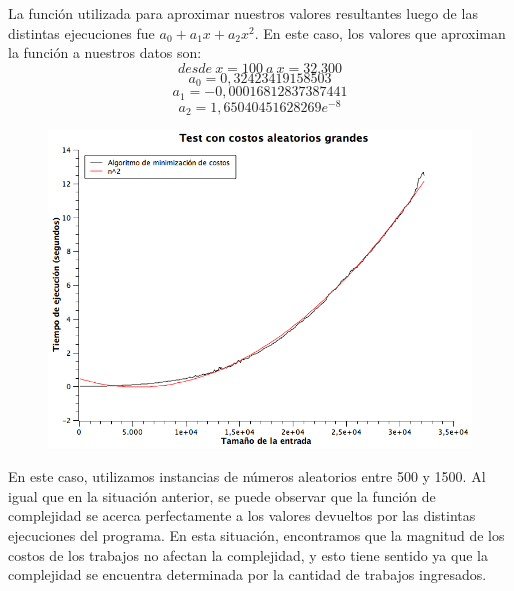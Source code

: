 La función utilizada para aproximar nuestros valores resultantes luego de las distintas ejecuciones fue $a_{0} + a_{1}x + a_{2}x^{2}$.
En este caso, los valores que aproximan la función a nuestros datos son:
$$desde\ x = 100\ a\ x = 32.300$$
$$a_{0} = 0,32423419158503$$
$$a_{1} = -0,00016812837387441$$
$$a_{2} = 1,65040451628269e^{-8}$$


\begin{figure}[H] %
\begin{center}
\includegraphics[width=350pt]{../tests/ej1/testGrande.png}
\end{center}
\end{figure}

En este caso, utilizamos instancias de números aleatorios entre 500 y 1500. Al igual que en la situación anterior, se puede observar que la función de complejidad se acerca perfectamente a los valores devueltos por las distintas ejecuciones del programa. En esta situación, encontramos que la magnitud de los costos de los trabajos no afectan la complejidad, y esto tiene sentido ya que la complejidad se encuentra determinada por la cantidad de trabajos ingresados.

